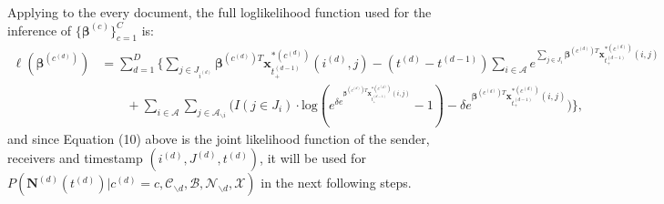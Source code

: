 \documentclass[a4paper]{article}
\begin{document}
  Applying to the every document, the full loglikelihood function used for the inference of $\{\boldsymbol{\beta}^{(c)}\}_{c=1}^C$ is:
  \begin{equation}
  \begin{split}
  \ell(\boldsymbol{\beta}^{(c^{(d)})}) &=\sum_{d=1}^D\Big\{\sum\limits_{j \in{J_{i^{(d)}}}}\boldsymbol{\beta}^{(c^{(d)})T}\boldsymbol{x}^{*(c^{(d)})}_{t^{(d-1)}_+}(i^{(d)}, j)-(t^{(d)}-t^{(d-1)})\sum\limits_{i \in \mathcal{A}}e^{\sum\limits_{j \in{J_i}}\boldsymbol{\beta}^{(c^{(d)})T}\boldsymbol{x}^{*(c^{(d)})}_{t^{(d-1)}_+}(i, j)}\\&\quad\quad+\sum\limits_{i\in \mathcal{A}}\sum\limits_{j \in \mathcal{A}_{\backslash i }}\Big(I(j \in J_i)\cdot\mbox{log}(e^{\delta e^{\boldsymbol{\beta}^{(c^{(d)})T}\boldsymbol{x}^{*(c^{(d)})}_{t^{(d-1)}_+}(i, j)}}-1)-\delta e^{\boldsymbol{\beta}^{(c^{(d)})T}\boldsymbol{x}^{*(c^{(d)})}_{t^{(d-1)}_+}(i, j)}\Big)\Big\},
  \end{split}\end{equation}
  and since Equation (10) above is the joint likelihood function of the sender, receivers and timestamp $(i^{(d)}, J^{(d)}, t^{(d)})$, it will be used for $P( \mathbf{N}^{(d)}{(t^{(d)})}| c^{(d)}=c, \mathcal{C}_{\backslash d}, \mathcal{B}, \mathcal{N}_{\backslash d}, \mathcal{X})$ in the next following steps.
  \newpage
\end{document}
